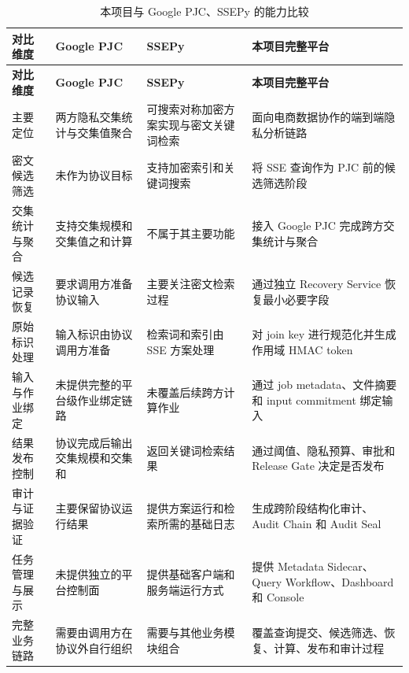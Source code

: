\documentclass[UTF8,a4paper,12pt,oneside]{ctexrep}
\begin{document}
\begin{longtable}{p{}p{}p{}p{}}
\caption{本项目与 Google PJC、SSEPy 的能力比较}
\label{tab:existing-work-comparison}\\
\toprule
\textbf{对比维度} &
\textbf{Google PJC} &
\textbf{SSEPy} &
\textbf{本项目完整平台} \\
\midrule
\endfirsthead

\toprule
\textbf{对比维度} &
\textbf{Google PJC} &
\textbf{SSEPy} &
\textbf{本项目完整平台} \\
\midrule
\endhead

\bottomrule
\endfoot

主要定位 &
两方隐私交集统计与交集值聚合 &
可搜索对称加密方案实现与密文关键词检索 &
面向电商数据协作的端到端隐私分析链路 \\

密文候选筛选 &
未作为协议目标 &
支持加密索引和关键词搜索 &
将 SSE 查询作为 PJC 前的候选筛选阶段 \\

交集统计与聚合 &
支持交集规模和交集值之和计算 &
不属于其主要功能 &
接入 Google PJC 完成跨方交集统计与聚合 \\

候选记录恢复 &
要求调用方准备协议输入 &
主要关注密文检索过程 &
通过独立 Recovery Service 恢复最小必要字段 \\

原始标识处理 &
输入标识由协议调用方准备 &
检索词和索引由 SSE 方案处理 &
对 join key 进行规范化并生成作用域 HMAC token \\

输入与作业绑定 &
未提供完整的平台级作业绑定链路 &
未覆盖后续跨方计算作业 &
通过 job metadata、文件摘要和 input commitment 绑定输入 \\

结果发布控制 &
协议完成后输出交集规模和交集和 &
返回关键词检索结果 &
通过阈值、隐私预算、审批和 Release Gate 决定是否发布 \\

审计与证据验证 &
主要保留协议运行结果 &
提供方案运行和检索所需的基础日志 &
生成跨阶段结构化审计、Audit Chain 和 Audit Seal \\

任务管理与展示 &
未提供独立的平台控制面 &
提供基础客户端和服务端运行方式 &
提供 Metadata Sidecar、Query Workflow、Dashboard 和 Console \\

完整业务链路 &
需要由调用方在协议外自行组织 &
需要与其他业务模块组合 &
覆盖查询提交、候选筛选、恢复、计算、发布和审计过程 \\

\end{longtable}
\end{document}
